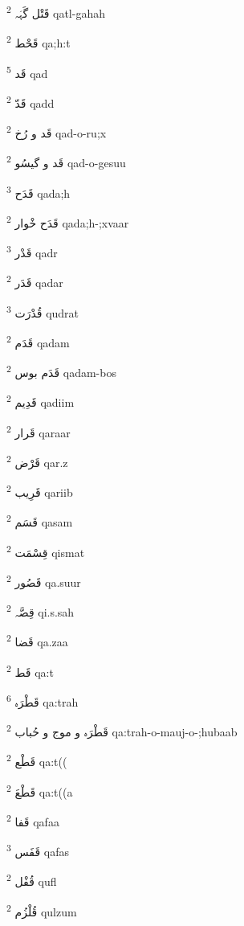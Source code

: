 \documentclass[12pt]{article}
\begin{document}
\begin{multicols}{5}
{\ur قَتْل گَہَہ}   \textsuperscript{2} qatl-gahah

{\ur قَحْط}   \textsuperscript{2} qa;h:t

{\ur قَد}   \textsuperscript{5} qad

{\ur قَدّ}   \textsuperscript{2} qadd

{\ur قَد و رُخ}   \textsuperscript{2} qad-o-ru;x

{\ur قَد و گیسُو}   \textsuperscript{2} qad-o-gesuu

{\ur قَدَح}   \textsuperscript{3} qada;h

{\ur قَدَح خْوار}   \textsuperscript{2} qada;h-;xvaar

{\ur قَدْر}   \textsuperscript{3} qadr

{\ur قَدَر}   \textsuperscript{2} qadar

{\ur قُدْرَت}   \textsuperscript{3} qudrat

{\ur قَدَم}   \textsuperscript{2} qadam

{\ur قَدَم بوس}   \textsuperscript{2} qadam-bos

{\ur قَدِیم}   \textsuperscript{2} qadiim

{\ur قَرار}   \textsuperscript{2} qaraar

{\ur قَرْض}   \textsuperscript{2} qar.z

{\ur قَرِیب}   \textsuperscript{2} qariib

{\ur قَسَم}   \textsuperscript{2} qasam

{\ur قِسْمَت}   \textsuperscript{2} qismat

{\ur قَصُور}   \textsuperscript{2} qa.suur

{\ur قِصَّہ}   \textsuperscript{2} qi.s.sah

{\ur قَضا}   \textsuperscript{2} qa.zaa

{\ur قَط}   \textsuperscript{2} qa:t

{\ur قَطْرَہ}   \textsuperscript{6} qa:trah

{\ur قَطْرَہ و موج و حُباب}   \textsuperscript{2} qa:trah-o-mauj-o-;hubaab

{\ur قَطْع}   \textsuperscript{2} qa:t((

{\ur قَطْعَ}   \textsuperscript{2} qa:t((a

{\ur قَفا}   \textsuperscript{2} qafaa

{\ur قَفَس}   \textsuperscript{3} qafas

{\ur قُفْل}   \textsuperscript{2} qufl

{\ur قُلْزُم}   \textsuperscript{2} qulzum


\end{multicols}
\end{document}
